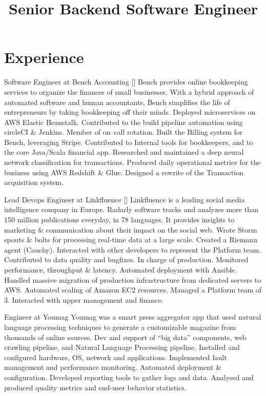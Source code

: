 \documentclass[12pt,a4paper]{moderncv}
\title{Senior Backend Software Engineer}             %
\begin{document}
\maketitle

\section{Experience}

        {Software Engineer at Bench Accounting}
        {}{}{[]}
{Bench provides online bookkeeping services to organize the finances of small businesses.
  With a hybrid approach of automated software and human accountants, Bench simplifies
  the life of entrepreneurs by taking bookkeeping off their minds.}
{Deployed microservices on AWS Elastic Beanstalk. Contributed to the build pipeline
  automation using circleCI \& Jenkins. Member of on--call rotation.}
{Built the Billing system for Bench, leveraging Stripe. Contributed to Internal tools for
  bookkeepers, and to the core Java/Scala financial app.}
{Researched and maintained a deep neural network classification for transactions.
  Produced daily operational metrics for the business using AWS Redshift \& Glue.
  Designed a rewrite of the Transaction acquisition system.}

        {Lead Devops Engineer at Linkfluence}
        {}{}{[]}
{Linkfluence is a leading social media intelligence company in Europe. Radarly
  software tracks and analyzes more than 150 million publications everyday, in 78 languages.
  It provides insights to marketing \& communication about their impact on the social web.}
{Wrote Storm spouts \& bolts for processing real-time data at a large scale.
  Created a Riemann agent (Cauchy). Interacted with other
  developers to represent the Platform team. Contributed to data quality and bugfixes.}
{In charge of production. Monitored performance, throughput \& latency.
  Automated deployment with Ansible. Handled massive migration of production
  infrastructure from dedicated servers to AWS. Automated scaling of Amazon EC2 resources.}
{Managed a Platform team of 3. Interacted with upper management and finance.}

        {Engineer at Youmag}
        {}{}{}
{Youmag was a smart press aggregator app that used
  natural language processing techniques to generate
  a customizable magazine from thousands of online sources.}
{Dev and support of ``big data'' components, web crawling pipeline,
 and Natural Language Processing pipeline.}
{Installed and configured hardware, OS, network and applications.
 Implemented fault management and performance monitoring.
 Automated deployment \& configuration.}
{Developed reporting tools to gather logs and data. Analysed and produced
 quality metrics and end-user behavior statistics.}
\end{document}
